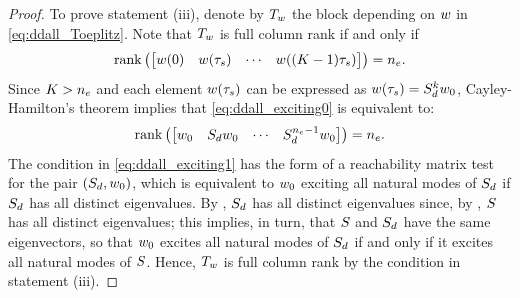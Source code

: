 \begin{proof}
  To prove statement (iii), denote by $T_w$ the block depending on $w$ in \eqref{eq:ddall_Toeplitz}. Note that $T_w$ is full column rank if and only if
  \begin{align}
    \label{eq:ddall_exciting0}
	  \operatorname{rank}\left(\begin{bmatrix}w(0) & w(\tau_s) & \cdots & w((K-1)\tau_s)\end{bmatrix}\right) = {n_e}.
  \end{align}
  Since $K>{n_e}$ and each element $w(\tau_s)$ can be expressed as $w(\tau_s)=S_d^{k} w_0$, Cayley-Hamilton's theorem implies that \eqref{eq:ddall_exciting0} is equivalent to:
  \begin{align}
    \label{eq:ddall_exciting1}
	  \operatorname{rank}\left(\begin{bmatrix}w_0 & S_d w_0 & \cdots & S_d^{{n_e}-1} w_0\end{bmatrix}\right)={n_e}.
  \end{align}
  The condition in \eqref{eq:ddall_exciting1} has the form of a reachability matrix test for the pair $(S_d,w_0)$, which is equivalent to $w_0$ exciting all natural modes of $S_d$ if $S_d$ has all distinct eigenvalues. By , $S_d$ has all distinct eigenvalues since, by , $S$ has all distinct eigenvalues; this implies, in turn, that $S$ and $S_d$ have the same eigenvectors, so that $w_0$ excites all natural modes of $S_d$ if and only if it excites all natural modes of $S$. Hence, $T_w$ is full column rank by the condition in statement (iii).


\end{proof}
